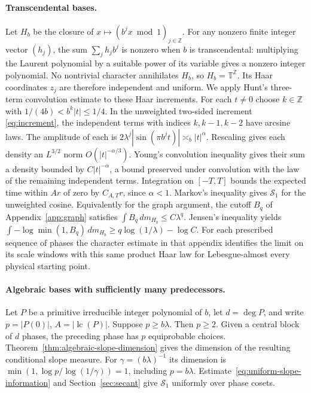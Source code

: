 \documentclass[11pt,a4paper]{article}
\newcommand{\T}{\mathbb T}
\begin{document}
\paragraph{Transcendental bases.}
Let $H_b$ be the closure of $x\mapsto (b^j x\bmod 1)_{j\in\mathbb Z}$.
For any nonzero finite integer vector $(h_j)$, the sum $\sum_j h_j b^j$
is nonzero when $b$ is transcendental: multiplying the Laurent
polynomial by a suitable power of its variable gives a nonzero integer
polynomial. No nontrivial character annihilates $H_b$, so
$H_b=\T^{\mathbb Z}$. Its Haar coordinates $z_j$ are therefore independent
and uniform. We apply Hunt's three-term convolution estimate
\cite[pp.~797--798]{hunt} to these Haar increments. For each $t\ne0$ choose $k\in\mathbb Z$ with
$1/(4b)<b^k|t|\le1/4$. In the unweighted two-sided increment
\eqref{eq:increment}, the independent terms with indices $k,k-1,k-2$
have arcsine laws. The amplitude of each is
$2\lambda^j|\sin(\pi b^jt)|\asymp_b |t|^\alpha$.
Rescaling gives each density an $L^{3/2}$ norm
$O(|t|^{-\alpha/3})$. Young's convolution inequality gives their
sum a density bounded by $C|t|^{-\alpha}$, a bound preserved under
convolution with the law of the remaining independent terms.
Integration on $[-T,T]$ bounds the expected time within $Ar$ of
zero by $C_{A,T}r$, since $\alpha<1$. Markov's inequality gives
$\mathcal S_1$ for the unweighted cosine. Equivalently for the graph
argument, the cutoff $B_q$ of Appendix~\ref{app:graph} satisfies
$\int B_q\,dm_{H_b}\le C\lambda^q$. Jensen's inequality yields
$\int -\log\min(1,B_q)\,dm_{H_b}\ge q\log(1/\lambda)-\log C$.
For each prescribed sequence of phases the character estimate in that
appendix identifies the limit on its scale windows with this same
product Haar law for Lebesgue-almost every physical starting point.

\paragraph{Algebraic bases with sufficiently many predecessors.}
Let $P$ be a primitive irreducible integer polynomial of $b$, let
$d=\deg P$, and write $p=|P(0)|$, $A=|\operatorname{lc}(P)|$.
Suppose $p\ge b\lambda$. Then $p\ge2$. Given a central block of
$d$ phases, the preceding phase has $p$ equiprobable choices.
Theorem~\ref{thm:algebraic-slope-dimension} gives the dimension of
the resulting conditional slope measure. For
$\gamma=(b\lambda)^{-1}$ its dimension is
$\min(1,\log p/\log(1/\gamma))=1$, including $p=b\lambda$.
Estimate~\eqref{eq:uniform-slope-information} and
Section~\ref{sec:secant} give $\mathcal S_1$ uniformly over phase
cosets.
\end{document}
